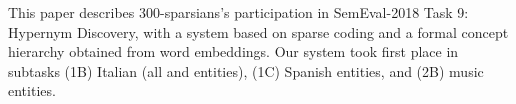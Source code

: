 This paper describes 300-sparsians's participation in SemEval-2018 Task 9: Hypernym Discovery, with a system based on sparse coding and a formal concept hierarchy obtained from word embeddings. Our system took first place in subtasks (1B) Italian (all and entities), (1C) Spanish entities, and (2B) music entities.
